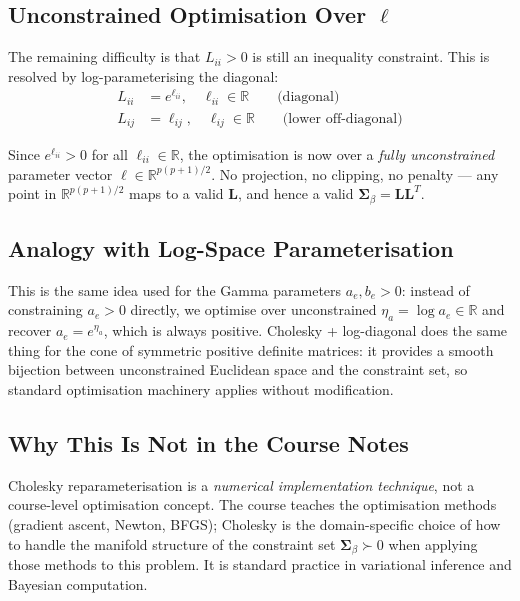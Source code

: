 \documentclass[11pt]{article}
\newcommand{\R}{\mathbb{R}}
\begin{document}
\subsection*{Unconstrained Optimisation Over $\bm{\ell}$}

The remaining difficulty is that $L_{ii} > 0$ is still an inequality constraint. This is resolved by log-parameterising the diagonal:
\begin{align}
  L_{ii} &= e^{\ell_{ii}}, \quad \ell_{ii} \in \R \qquad \text{(diagonal)}\\
  L_{ij} &= \ell_{ij}, \quad \ell_{ij} \in \R \qquad \text{(lower off-diagonal)}
\end{align}

Since $e^{\ell_{ii}} > 0$ for all $\ell_{ii} \in \R$, the optimisation is now over a \emph{fully unconstrained} parameter vector $\bm{\ell} \in \R^{p(p+1)/2}$. No projection, no clipping, no penalty --- any point in $\R^{p(p+1)/2}$ maps to a valid $\bm{L}$, and hence a valid $\bm{\Sigma}_\beta = \bm{L}\bm{L}^T$.

\subsection*{Analogy with Log-Space Parameterisation}

This is the same idea used for the Gamma parameters $a_e, b_e > 0$: instead of constraining $a_e > 0$ directly, we optimise over unconstrained $\eta_a = \log a_e \in \R$ and recover $a_e = e^{\eta_a}$, which is always positive. Cholesky + log-diagonal does the same thing for the cone of symmetric positive definite matrices: it provides a smooth bijection between unconstrained Euclidean space and the constraint set, so standard optimisation machinery applies without modification.

\subsection*{Why This Is Not in the Course Notes}

Cholesky reparameterisation is a \emph{numerical implementation technique}, not a course-level optimisation concept. The course teaches the optimisation methods (gradient ascent, Newton, BFGS); Cholesky is the domain-specific choice of how to handle the manifold structure of the constraint set $\bm{\Sigma}_\beta \succ 0$ when applying those methods to this problem. It is standard practice in variational inference and Bayesian computation.
\end{document}
